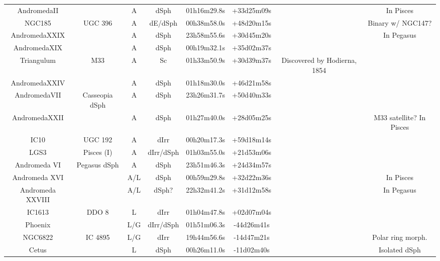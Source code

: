 \begin{table}
\begin{tabular}{cccccccc}
AndromedaII          &                          & A & dSph & 01h16m29.8s & +33d25m09s &\cite{vandenbergh1972a} & In Pisces\\
NGC185               & UGC 396                  & A &dE/dSph& 00h38m58.0s & +48d20m15s & \cite{herschel1789}  &Binary w/ NGC147?\\
AndromedaXXIX        &                          & A & dSph & 23h58m55.6s & +30d45m20s &\cite{bell2011} & In Pegasus\\
AndromedaXIX         &                          & A & dSph & 00h19m32.1s & +35d02m37s &\cite{mcconnachie2008b}&\\
Triangulum            & M33                      & A & Sc   & 01h33m50.9s & +30d39m37s & Discovered by Hodierna, 1854&\\
AndromedaXXIV        &                          & A & dSph & 01h18m30.0s & +46d21m58s &\cite{richardson2011}&\\
AndromedaVII         & Casseopia dSph           & A & dSph & 23h26m31.7s & +50d40m33s &\cite{karachentsev1999}&\\
AndromedaXXII        &                          & A & dSph & 01h27m40.0s & +28d05m25s &\cite{martin2009} & M33 satellite? In Pisces\\
IC10                 & UGC 192                  & A & dIrr & 00h20m17.3s & +59d18m14s &\cite{swift1888}&\\
LGS3   & Pisces (I)               & A & dIrr/dSph& 01h03m55.0s & +21d53m06s &\cite{karachentseva1976}&\\
Andromeda VI          & Pegasus dSph             & A & dSph & 23h51m46.3s & +24d34m57s &\cite{karachentsev1999}&\\
Andromeda XVI         &                          &A/L& dSph & 00h59m29.8s & +32d22m36s &\cite{ibata2007} & In Pisces\\
Andromeda XXVIII      &                          &A/L&dSph? & 22h32m41.2s & +31d12m58s & \cite{slater2011} & In Pegasus\\
IC1613               & DDO 8                    & L & dIrr & 01h04m47.8s & +02d07m04s & \cite{wolf1906}&\\
Phoenix               &                          &L/G& dIrr/dSph & 01h51m06.3s & -44d26m41s &\cite{schuster1976}\tablenotemark{a}&\\
NGC6822              & IC 4895                  &L/G& dIrr & 19h44m56.6s & -14d47m21s & \cite{barnard1884} & Polar ring morph.\\
Cetus                 &                          & L & dSph & 00h26m11.0s & -11d02m40s &\cite{whiting1999} & Isolated dSph\\

\end{tabular}
\end{table}
